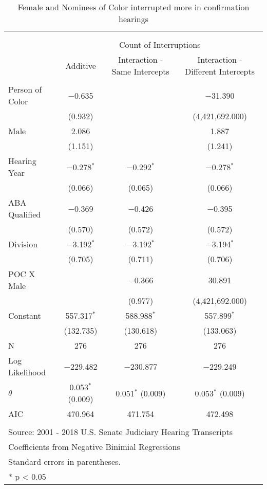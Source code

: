 
\begin{table}[!htbp] \centering 
  \caption{Female and Nominees of Color interrupted more in confirmation hearings} 
  \label{} 
\begin{tabular}{@{\extracolsep{5pt}}lccc} 
\\[-1.8ex]\hline \\[-1.8ex] 
\\[-1.8ex] & \multicolumn{3}{c}{Count of Interruptions} \\ 
 & Additive & Interaction - Same Intercepts & Interaction - Different Intercepts \\ 
\hline \\[-1.8ex] 
 Person of Color & $-$0.635 &  & $-$31.390 \\ 
  & (0.932) &  & (4,421,692.000) \\ 
  Male & 2.086 &  & 1.887 \\ 
  & (1.151) &  & (1.241) \\ 
  Hearing Year & $-$0.278$^{*}$ & $-$0.292$^{*}$ & $-$0.278$^{*}$ \\ 
  & (0.066) & (0.065) & (0.066) \\ 
  ABA Qualified & $-$0.369 & $-$0.426 & $-$0.395 \\ 
  & (0.570) & (0.572) & (0.572) \\ 
  Division & $-$3.192$^{*}$ & $-$3.192$^{*}$ & $-$3.194$^{*}$ \\ 
  & (0.705) & (0.711) & (0.706) \\ 
  POC X Male &  & $-$0.366 & 30.891 \\ 
  &  & (0.977) & (4,421,692.000) \\ 
  Constant & 557.317$^{*}$ & 588.988$^{*}$ & 557.899$^{*}$ \\ 
  & (132.735) & (130.618) & (133.063) \\ 
 N & 276 & 276 & 276 \\ 
Log Likelihood & $-$229.482 & $-$230.877 & $-$229.249 \\ 
$\theta$ & 0.053$^{*}$  (0.009) & 0.051$^{*}$  (0.009) & 0.053$^{*}$  (0.009) \\ 
AIC & 470.964 & 471.754 & 472.498 \\ 
\hline \\[-1.8ex] 
\multicolumn{4}{l}{Source: 2001 - 2018 U.S. Senate Judiciary Hearing Transcripts} \\ 
\multicolumn{4}{l}{Coefficients from Negative Binimial Regressions} \\ 
\multicolumn{4}{l}{Standard errors in parentheses.} \\ 
\multicolumn{4}{l}{* p < 0.05} \\ 
\end{tabular} 
\end{table} 
